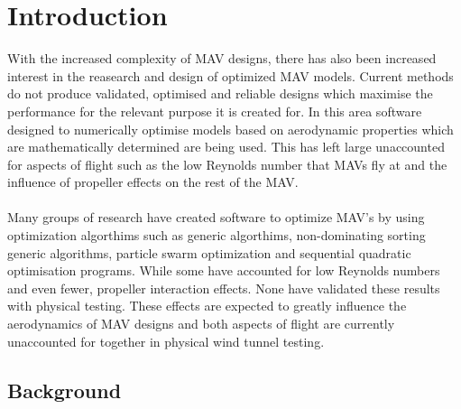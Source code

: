 \graphicspath{{./Figs/}}

\chapter{Introduction} 


With the increased complexity of MAV designs, there has also been increased interest in the reasearch and design of optimized MAV models. Current methods  do not produce validated, optimised and reliable designs which maximise the performance for the relevant purpose it is created for. In this area software designed to numerically optimise models based on aerodynamic properties which are mathematically determined are being used. This has left large unaccounted for aspects of flight such as the low Reynolds number that MAVs fly at and the influence of propeller effects on the rest of the MAV.\\
\\
Many groups of research have  created software to optimize MAV's by using optimization algorthims such as generic algorthims, non-dominating sorting generic algorithms, particle swarm optimization and sequential quadratic optimisation programs. While some have accounted for low Reynolds numbers and even fewer, propeller interaction effects. None have validated these results with physical testing. These effects are expected to greatly influence the aerodynamics of MAV designs and both aspects of flight are currently unaccounted for together in physical wind tunnel testing.

\section{Background}


